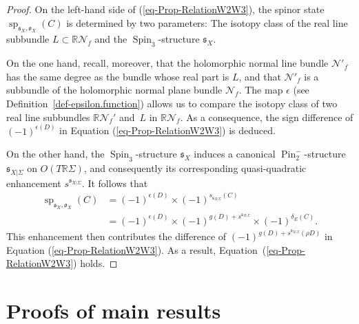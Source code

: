 \documentclass[11pt]{amsart}
\numberwithin{equation}{section}
\theoremstyle{definition}
\theoremstyle{plain}
\theoremstyle{remark}
\newcommand{\R}{\mathbb{R}}
\DeclareMathOperator{\Pin}{Pin}
\DeclareMathOperator{\Spin}{Spin}
\renewcommand{\sp}{\operatorname{sp}}
\begin{document}
 \begin{proof}
On the left-hand side of (\ref{eq-Prop-RelationW2W3}), the spinor state $\sp_{\mathfrak{s}_X,\mathfrak{o}_X}(C)$ is determined by two parameters: The isotopy class of the real line subbundle  $L \subset \R \mathcal{N}_f$ and the $\Spin_3$-structure $\mathfrak{s}_X$. 
 
On the one hand, recall, moreover, that the holomorphic normal line bundle $\mathcal{N}'_f$  has the same degree as the bundle whose real part is $L$, and that $\mathcal{N}'_f$ is a subbundle of the holomorphic normal plane bundle $\mathcal{N}_f$.  
The map $\epsilon$ (see Definition~\ref{def-epsilon.function}) allows us to compare the isotopy class of two real line subbundles $\R \mathcal{N}_f'$ and~$L$ in $\R \mathcal{N}_f$. As a consequence, the sign difference of $(-1)^{\epsilon(D)}$ in Equation (\ref{eq-Prop-RelationW2W3}) is deduced.

On the other hand, the $\Spin_3$-structure $\mathfrak{s}_X$ induces a canonical $\Pin^-_2$-structure $\mathfrak{s}_{X|\Sigma}$ on $O(T \R \Sigma)$, and consequently its corresponding quasi-quadratic enhancement $s^{\mathfrak{s}_{X|\Sigma}}$. It follows that
\begin{align*}
    \sp_{\mathfrak{s}_X,\mathfrak{o}_X}(C)&=(-1)^{\epsilon(D)}\times (-1)^{s_{\mathfrak{s}_{X|\Sigma}}(C)}\\
    &=(-1)^{\epsilon(D)}\times (-1)^{g(D)+s^{\mathfrak{s}_{X|\Sigma}}}\times (-1)^{\delta_E(C)}.
\end{align*}
 This enhancement then contributes the difference of $(-1)^{g(D)+s^{\mathfrak{s}_{X|\Sigma}}(\rho D)}$ in Equation (\ref{eq-Prop-RelationW2W3}). As a result, Equation~(\ref{eq-Prop-RelationW2W3}) holds.
 \end{proof} 

 
\section{Proofs of main results}
\label{Sect-proofs}
\end{document}
